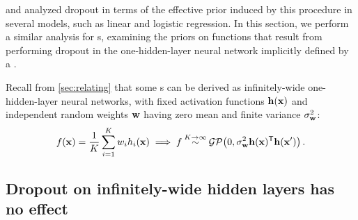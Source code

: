 \citet{baldi2013understanding} and \citet{wang2013fast} analyzed dropout in terms of the effective prior induced by this procedure in several models, such as linear and logistic regression.
In this section, we perform a similar analysis for \gp{}s, examining the priors on functions that result from performing dropout in the one-hidden-layer neural network implicitly defined by a \gp{}.

Recall from \cref{sec:relating} that some \gp{}s can be derived as infinitely-wide one-hidden-layer neural networks, with fixed activation functions ${\bf{h}}({\bf{x}})$ and independent random weights ${\bf{w}}$ having zero mean and finite variance $\sigma^2_{{\bf{w}}}$:
%
\begin{align}
f({\bf{x}}) 
= \frac{1}{K} \sum_{i=1}^K w_i h_i({\bf{x}})
\implies f \mathbin{\overset{K \to \infty}{\sim}} \mathcal{GP}\!\left(0,\sigma^2_{{\bf{w}}} {\bf{h}}({\bf{x}})^{\mathsf{T}}{\bf{h}}({\bf{x}}')\right) .
\label{eq:one-layer-gp-two}
\end{align}
%



\subsection{Dropout on infinitely-wide hidden layers has no effect}

